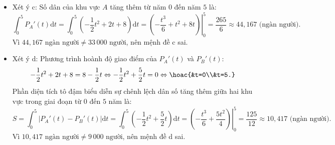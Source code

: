 \begin{ex}
{\begin{itemize}
 Đường thẳng $P_B'(t)$ cũng đi qua giao điểm này, do đó $P_B'(0) = 8$.
 Thay $t=0$ vào hàm số của khu vực $B$, ta được: $a - \frac{1}{2}\cdot 0 = 8 \Rightarrow a = 8$.
 Vậy mệnh đề b đúng.
 \item Xét ý c: Số dân của khu vực $A$ tăng thêm từ năm $0$ đến năm $5$ là:
 $$\int_0^5 P_A'(t)\mathrm{d}t = \int_0^5 \left(-\frac{1}{2}t^2 + 2t + 8\right)\mathrm{d}t = \left. \left(-\frac{t^3}{6} + t^2 + 8t\right) \right|_0^5 = \frac{265}{6} \approx 44,167 \text{ (ngàn người)}.$$
 Vì $44,167 \text{ ngàn người} \neq 33\,000 \text{ người}$, nên mệnh đề c sai.
 \item Xét ý d: Phương trình hoành độ giao điểm của $P_A'(t)$ và $P_B'(t)$:
 $$-\frac{1}{2}t^2 + 2t + 8 = 8 - \frac{1}{2}t \Leftrightarrow -\frac{1}{2}t^2 + \frac{5}{2}t = 0 \Leftrightarrow \hoac{&t=0\\&t=5.}$$
 Phần diện tích tô đậm biểu diễn sự chênh lệch dân số tăng thêm giữa hai khu vực trong giai đoạn từ $0$ đến $5$ năm là:
 $$S = \int_0^5 \left| P_A'(t) - P_B'(t) \right|\mathrm{d}t = \int_0^5 \left( -\frac{1}{2}t^2 + \frac{5}{2}t \right)\mathrm{d}t = \left. \left( -\frac{t^3}{6} + \frac{5t^2}{4} \right) \right|_0^5 = \frac{125}{12} \approx 10,417 \text{ (ngàn người)}.$$
 Vì $10,417 \text{ ngàn người} \neq 9\,000 \text{ người}$, nên mệnh đề d sai.
 \end{itemize}
 }
\end{ex}
